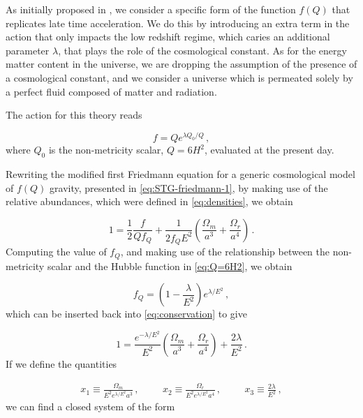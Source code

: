 As initially proposed in \cite{Anagnostopoulos2021}, we consider a specific form of the function  $f(Q)$ that replicates late time acceleration. We do this by introducing an extra term in the action that only impacts the low redshift regime, which caries an additional parameter $\lambda$, that plays the role of the cosmological constant. As for the energy matter content in the universe, we are dropping the assumption of the presence of a cosmological constant, and we consider a universe which is permeated solely by a perfect fluid composed of matter and radiation.

The action for this theory reads

\begin{equation}
    \label{eq:STG-dark-energy-model}
    f = Qe^{\lambda Q_0/Q} \,,
\end{equation}
where $Q_0$ is the non-metricity scalar, $Q=6H^2$, evaluated at the present day.

Rewriting the modified first Friedmann equation for a generic cosmological model of $f(Q)$ gravity, presented in \cref{eq:STG-friedmann-1}, by making use of the relative abundances, which were defined in \cref{eq:densities}, we obtain

\begin{equation}
    \label{eq:conservation}
    1 = \frac{1}{2} \frac{f}{Q f_Q}
    + \frac{1}{2 f_Q E^2}
    \left( \frac{\Omega_m}{a^3} + \frac{\Omega_r}{a^4}\right) \,.
\end{equation}
Computing the value of $f_Q$, and making use of the relationship between the non-metricity scalar and the Hubble function in \cref{eq:Q=6H2}, we obtain

\begin{equation}
    \label{eq:f_Q}
    f_Q = \left( 1 - \frac{\lambda}{E^2} \right) e^{\lambda/E^2} \,,
\end{equation}
which can be inserted back into \cref{eq:conservation} to give

\begin{equation}
    1 = \frac{e^{- \lambda / E^2}}{E^2} \left( \frac{\Omega_m}{a^3}
    + \frac{\Omega_r}{a^4} \right) + \frac{2\lambda}{E^2} \,.
\end{equation}
If we define the quantities

\begin{gather}
    x_1 \equiv \frac{\Omega_m}{E^2 e^{\lambda / E^2} a^3} \,, \hspace{1cm}
    x_2 \equiv \frac{\Omega_r}{E^2 e^{\lambda / E^2} a^4} \,, \hspace{1cm}
    x_3 \equiv \frac{2 \lambda}{E^2} \,,
\end{gather}
we can find a closed system of the form


